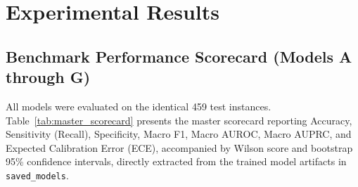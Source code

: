 \documentclass[conference]{IEEEtran}
\begin{document}
\section{Experimental Results}

\subsection{Benchmark Performance Scorecard (Models A through G)}
All models were evaluated on the identical 459 test instances. Table~\ref{tab:master_scorecard} presents the master scorecard reporting Accuracy, Sensitivity (Recall), Specificity, Macro F1, Macro AUROC, Macro AUPRC, and Expected Calibration Error (ECE), accompanied by Wilson score and bootstrap 95\% confidence intervals, directly extracted from the trained model artifacts in \texttt{saved\_models}.
\end{document}
